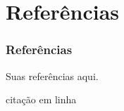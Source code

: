 \section{Referências}
\begin{frame}
  \frametitle{Referências}

  Suas referências aqui.
  
  citação em linha \cite{stewart}

  



\end{frame}